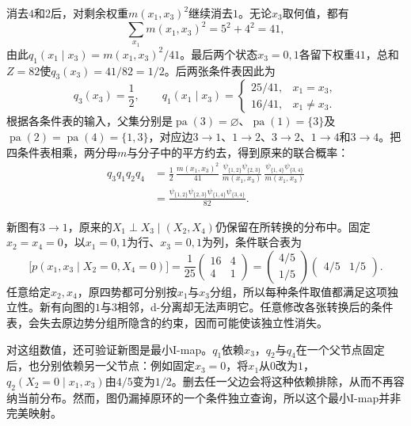 消去$4$和$2$后，对剩余权重$m(x_1,x_3)^2$继续消去$1$。无论$x_3$取何值，都有
\[
  \sum_{x_1}m(x_1,x_3)^2=5^2+4^2=41,
\]
由此$q_1(x_1\mid x_3)=m(x_1,x_3)^2/41$。最后两个状态$x_3=0,1$各留下权重$41$，总和$Z=82$使$q_3(x_3)=41/82=1/2$。后两张条件表因此为
\begin{equation}
  q_3(x_3)=\frac12,\qquad
  q_1(x_1\mid x_3)=
  \begin{cases}
    25/41,&x_1=x_3,\\
    16/41,&x_1\ne x_3.
  \end{cases}
  \label{eq:pgm-representations-cycle-root-tables}
\end{equation}
根据各条件表的输入，父集分别是$\operatorname{pa}(3)=\varnothing$、$\operatorname{pa}(1)=\{3\}$及$\operatorname{pa}(2)=\operatorname{pa}(4)=\{1,3\}$，对应边$3\to1$、$1\to2$、$3\to2$、$1\to4$和$3\to4$。把四条件表相乘，两分母$m$与分子中的平方约去，得到原来的联合概率：
\[
  \begin{aligned}
    q_3q_1q_2q_4
    &=\frac12\,
      \frac{m(x_1,x_3)^2}{41}\,
      \frac{\psi_{\{1,2\}}\psi_{\{2,3\}}}{m(x_1,x_3)}\,
      \frac{\psi_{\{1,4\}}\psi_{\{3,4\}}}{m(x_1,x_3)}\\
    &=\frac{
      \psi_{\{1,2\}}\psi_{\{2,3\}}
      \psi_{\{1,4\}}\psi_{\{3,4\}}}{82}.
  \end{aligned}
\]

新图有$3\to1$，原来的$X_1\perp X_3\mid(X_2,X_4)$仍保留在所转换的分布中。固定$x_2=x_4=0$，以$x_1=0,1$为行、$x_3=0,1$为列，条件联合表为
\[
  \bigl[p(x_1,x_3\mid X_2=0,X_4=0)\bigr]
  =\frac1{25}
  \begin{pmatrix}16&4\\4&1\end{pmatrix}
  =
  \begin{pmatrix}4/5\\1/5\end{pmatrix}
  \begin{pmatrix}4/5&1/5\end{pmatrix}.
\]
任意给定$x_2,x_4$，原四势都可分别按$x_1$与$x_3$分组，所以每种条件取值都满足这项独立性。新有向图的$1$与$3$相邻，d-分离却无法声明它。任意修改各张转换后的条件表，会失去原边势分组所隐含的约束，因而可能使该独立性消失。

对这组数值，还可验证新图是最小I-map。$q_1$依赖$x_3$，$q_2$与$q_4$在一个父节点固定后，也分别依赖另一父节点：例如固定$x_3=0$，将$x_1$从$0$改为$1$，$q_2(X_2=0\mid x_1,x_3)$由$4/5$变为$1/2$。删去任一父边会将这种依赖排除，从而不再容纳当前分布。然而，图仍漏掉原环的一个条件独立查询，所以这个最小I-map并非完美映射。

